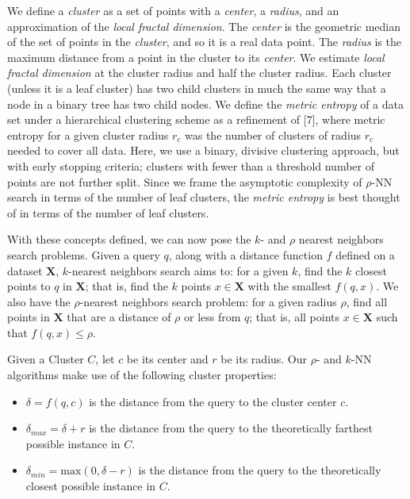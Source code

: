 We define a \emph{cluster} as a set of points with a \emph{center}, a \emph{radius}, and an approximation of the \emph{local fractal dimension}.
The \emph{center} is the geometric median of the set of points in the \emph{cluster}, and so it is a real data point. The \emph{radius} is the
maximum distance from a point in the cluster to its \emph{center}. We estimate \emph{local fractal dimension} at the cluster radius and half
the cluster radius. Each cluster (unless it is a leaf cluster) has two child clusters in much the same way that a node in
a binary tree has two child nodes. We define the \emph{metric entropy} of a data set under a hierarchical clustering scheme as a refinement of [7], where
metric entropy for a given cluster radius $r_c$ was the number of clusters of radius $r_c$ needed to cover all data. Here, we use a binary, divisive clustering 
approach, but with early stopping criteria; clusters with fewer than a threshold number of points are not further split. 
Since we frame the asymptotic complexity of $\rho$-NN search in terms of the number of leaf clusters, the \emph{metric entropy} is best thought of in terms of the number of
leaf clusters. 

With these concepts defined, we can now pose the $k$- and $\rho$ nearest neighbors search problems.
Given a query $q$, along with a distance function $f$ defined on a dataset $ \textbf{X}$, $k$-nearest neighbors search aims to: 
for a given $k$, find the $k$ closest points to $q$ in $ \textbf{X}$; that is, find the $k$ points $x \in \textbf{X}$ with the smallest $f(q, x)$.
We also have the $\rho$-nearest neighbors search problem: for a given radius $\rho$, find all points in $\textbf{X}$ that are a distance of $\rho$ 
or less from $q$; that is, all points $x \in \textbf{X}$ such that $f(q, x) \leq \rho$.

Given a Cluster $C$, let $c$ be its center and $r$ be its radius. Our $\rho$- and $k$-NN algorithms make use of the following cluster 
properties:
\begin{itemize}
    \item $\delta = f(q, c)$ is the distance from the query to the cluster center $c$.
    \item $\delta_{max} = \delta + r$ is the distance from the query to the theoretically farthest possible instance in $C$.
    \item $\delta_{min} = \text{max}(0, \delta - r)$ is the distance from the query to the theoretically closest possible instance in $C$.
\end{itemize}

